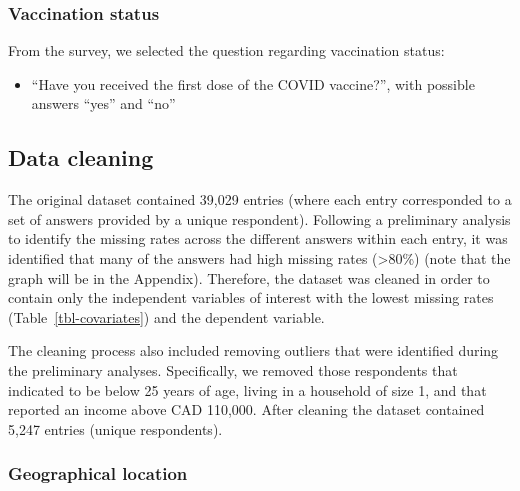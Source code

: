 \documentclass[
  letterpaper,
  DIV=11,
  numbers=noendperiod]{scrartcl}
\providecommand{\tightlist}{%
  \setlength{\itemsep}{0pt}\setlength{\parskip}{0pt}}\usepackage{longtable,booktabs,array}
\begin{document}
\hypertarget{vaccination-status}{%
\subsubsection{Vaccination status}\label{vaccination-status}}

From the survey, we selected the question regarding vaccination status:

\begin{itemize}
\tightlist
\item
  ``Have you received the first dose of the COVID vaccine?'', with
  possible answers ``yes'' and ``no''
\end{itemize}

\hypertarget{data-cleaning}{%
\subsection{Data cleaning}\label{data-cleaning}}

The original dataset contained 39,029 entries (where each entry
corresponded to a set of answers provided by a unique respondent).
Following a preliminary analysis to identify the missing rates across
the different answers within each entry, it was identified that many of
the answers had high missing rates (\textgreater80\%) (note that the
graph will be in the Appendix). Therefore, the dataset was cleaned in
order to contain only the independent variables of interest with the
lowest missing rates (Table~\ref{tbl-covariates}) and the dependent
variable.

The cleaning process also included removing outliers that were
identified during the preliminary analyses. Specifically, we removed
those respondents that indicated to be below 25 years of age, living in
a household of size 1, and that reported an income above CAD 110,000.
After cleaning the dataset contained 5,247 entries (unique respondents).

\hypertarget{sec-geographical-location}{%
\subsubsection{Geographical location}\label{sec-geographical-location}}
\end{document}
